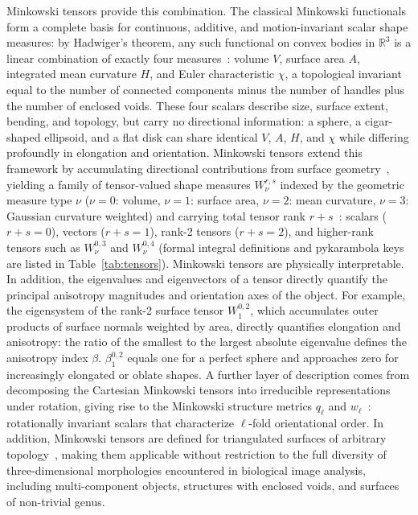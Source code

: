 \documentclass[unnumsec,webpdf,contemporary,large,namedate]{oup-authoring-template}
\begin{document}
Minkowski tensors provide this combination.
The classical Minkowski functionals form a complete basis for continuous, additive, and motion-invariant scalar shape measures: by Hadwiger's theorem, any such functional on convex bodies in $\mathbb{R}^3$ is a linear combination of exactly four measures~\citep{Hadwiger1957}: volume $V$, surface area $A$, integrated mean curvature $H$, and Euler characteristic $\chi$, a topological invariant equal to the number of connected components minus the number of handles plus the number of enclosed voids.
These four scalars describe size, surface extent, bending, and topology, but carry no directional information: a sphere, a cigar-shaped ellipsoid, and a flat disk can share identical $V$, $A$, $H$, and $\chi$ while differing profoundly in elongation and orientation.
Minkowski tensors extend this framework by accumulating directional contributions from surface geometry~\citep{SchroderTurk2013}, yielding a family of tensor-valued shape measures $W_\nu^{r,s}$ indexed by the geometric measure type $\nu$ ($\nu=0$: volume, $\nu=1$: surface area, $\nu=2$: mean curvature, $\nu=3$: Gaussian curvature weighted) and carrying total tensor rank $r+s$~\citep{SchroderTurk2013}: scalars ($r+s=0$), vectors ($r+s=1$), rank-2 tensors ($r+s=2$), and higher-rank tensors such as $W_\nu^{0,3}$ and $W_\nu^{0,4}$ (formal integral definitions and pykarambola keys are listed in Table~\ref{tab:tensors}).
Minkowski tensors are physically interpretable. In addition, the eigenvalues and eigenvectors of a tensor directly quantify the principal anisotropy magnitudes and orientation axes of the object.
For example, the eigensystem of the rank-2 surface tensor $W_1^{0,2}$, which accumulates outer products of surface normals weighted by area, directly quantifies elongation and anisotropy: the ratio of the smallest to the largest absolute eigenvalue defines the anisotropy index $\beta$.
$\beta_1^{0,2}$ equals one for a perfect sphere and approaches zero for increasingly elongated or oblate shapes.
A further layer of description comes from decomposing the Cartesian Minkowski tensors into irreducible representations under rotation, giving rise to the Minkowski structure metrics $q_\ell$ and $w_\ell$~\citep{Steinhardt1983, Mickel2013}: rotationally invariant scalars that characterize $\ell$-fold orientational order.
In addition, Minkowski tensors are defined for triangulated surfaces of arbitrary topology~\citep{SchroderTurk2013}, making them applicable without restriction to the full diversity of three-dimensional morphologies encountered in biological image analysis, including multi-component objects, structures with enclosed voids, and surfaces of non-trivial genus.
\end{document}
